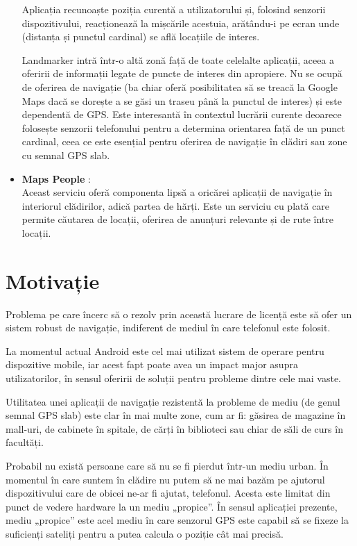 \documentclass[12pt,a4paper]{article}
\begin{document}
\begin{itemize}
Aplicația recunoaște poziția curentă a utilizatorului și, folosind senzorii dispozitivului, reacționează la mișcările acestuia, arătându-i pe ecran unde (distanța și punctul cardinal) se află locațiile de interes.

Landmarker intră într-o altă zonă față de toate celelalte aplicații, aceea a oferirii de informații legate de puncte de interes din apropiere. Nu se ocupă de oferirea de navigație (ba chiar oferă posibilitatea să se treacă la Google Maps dacă se dorește a se găsi un traseu până la punctul de interes) și este dependentă de GPS. Este interesantă în contextul lucrării curente deoarece folosește senzorii telefonului pentru a determina orientarea față de un punct cardinal, ceea ce este esențial pentru oferirea de navigație în clădiri sau zone cu semnal GPS slab.

\item \textbf{Maps People} \cite{MapsPeople}:\\
Aceast serviciu oferă componenta lipsă a oricărei aplicații de navigație în interiorul clădirilor, adică partea de hărți. Este un serviciu cu plată care permite căutarea de locații, oferirea de anunțuri relevante și de rute între locații.

\end{itemize}

\newpage
\section{Motivație}
Problema pe care încerc să o rezolv prin această lucrare de licență este să ofer un sistem robust de navigație, indiferent de mediul în care telefonul este folosit.

La momentul actual Android este cel mai utilizat sistem de operare pentru dispozitive mobile, iar acest fapt poate avea un impact major asupra utilizatorilor, în sensul oferirii de soluții pentru probleme dintre cele mai vaste.

Utilitatea unei aplicații de navigație rezistentă la probleme de mediu (de genul semnal GPS slab) este clar în mai multe zone, cum ar fi: găsirea de magazine în mall-uri, de cabinete în spitale, de cărți în biblioteci sau chiar de săli de curs în facultăți. 

Probabil nu există persoane care să nu se fi pierdut într-un mediu urban. În momentul în care suntem în clădire nu putem să ne mai bazăm pe ajutorul dispozitivului care de obicei ne-ar fi ajutat, telefonul. Acesta este limitat din punct de vedere hardware la un mediu „propice”. În sensul aplicației prezente, mediu „propice” este acel mediu în care senzorul GPS este capabil să se fixeze la suficienți sateliți pentru a putea calcula o poziție cât mai precisă.
\end{document}
